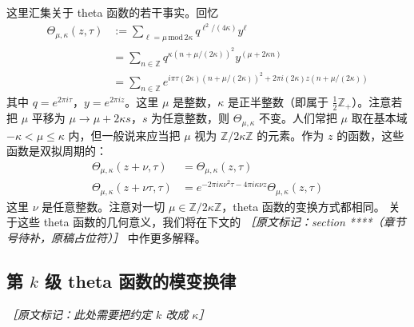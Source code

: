 这里汇集关于 theta 函数的若干事实。回忆
\begin{equation}
\begin{aligned}
  \Theta_{\mu,\kappa}(z,\tau) &:= \sum_{\ell=\mu\,\mathrm{mod}\,2\kappa} q^{\ell^2/(4\kappa)} y^{\ell}\\
  &= \sum_{n\in\mathbb{Z}} q^{\kappa(n+\mu/(2\kappa))^2} y^{(\mu+2\kappa n)}\\
  &= \sum_{n\in\mathbb{Z}} e^{i\pi\tau(2\kappa)(n+\mu/(2\kappa))^2+2\pi i(2\kappa)z(n+\mu/(2\kappa))}
\end{aligned}
\tag{D.1}
\label{eq:D.1}
\end{equation}
其中 $q=e^{2\pi i\tau}$，$y=e^{2\pi iz}$。这里 $\mu$ 是整数，$\kappa$ 是正半整数（即属于
$\frac12\mathbb{Z}_+$）。注意若把 $\mu$ 平移为 $\mu\to\mu+2\kappa s$，$s$ 为任意整数，则
$\Theta_{\mu,\kappa}$ 不变。人们常把 $\mu$ 取在基本域 $-\kappa<\mu\le\kappa$ 内，但一般说来应当把
$\mu$ 视为 $\mathbb{Z}/2\kappa\mathbb{Z}$ 的元素。作为 $z$ 的函数，这些函数是双拟周期的：
\begin{equation}
\begin{aligned}
  \Theta_{\mu,\kappa}(z+\nu,\tau) &= \Theta_{\mu,\kappa}(z,\tau)\\
  \Theta_{\mu,\kappa}(z+\nu\tau,\tau) &= e^{-2\pi i\kappa\nu^2\tau-4\pi i\kappa\nu z}\Theta_{\mu,\kappa}(z,\tau)
\end{aligned}
\tag{D.2}
\label{eq:D.2}
\end{equation}
这里 $\nu$ 是任意整数。注意对一切 $\mu\in\mathbb{Z}/2\kappa\mathbb{Z}$，theta 函数的变换方式都相同。
关于这些 theta 函数的几何意义，我们将在下文的
{\small\itshape ［原文标记：section ****（章节号待补，原稿占位符）］} 中作更多解释。


\subsection{第 $k$ 级 theta 函数的模变换律} %
{\small\itshape ［原文标记：此处需要把约定 $k$ 改成 $\kappa$］}

